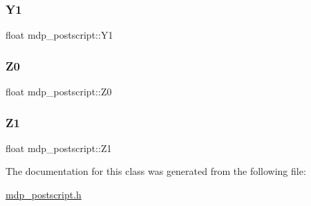 \subsubsection{\texorpdfstring{Y1}{Y1}}
{\footnotesize\ttfamily float mdp\+\_\+postscript\+::\+Y1}

\mbox{\label{classmdp__postscript_a5c27b031c6f79593b476dfa6a69e146f}} 
\subsubsection{\texorpdfstring{Z0}{Z0}}
{\footnotesize\ttfamily float mdp\+\_\+postscript\+::\+Z0}

\mbox{\label{classmdp__postscript_ac512287091dcecae1a549d005083554f}} 
\subsubsection{\texorpdfstring{Z1}{Z1}}
{\footnotesize\ttfamily float mdp\+\_\+postscript\+::\+Z1}



The documentation for this class was generated from the following file\+:\begin{DoxyCompactItemize}
\item 
\hyperlink{mdp__postscript_8h}{mdp\+\_\+postscript.\+h}\end{DoxyCompactItemize}
